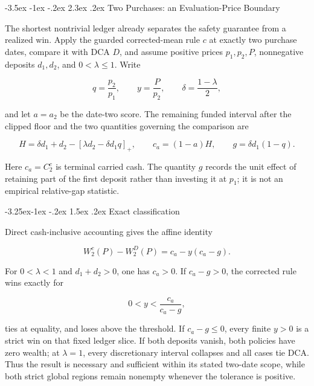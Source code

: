 \documentclass[12pt,a4paper,oneside]{report}
\makeatletter
\renewcommand\section{\@startsection{section}{1}{\z@}%
  {-3.5ex \@plus -1ex \@minus -.2ex}%
  {2.3ex \@plus .2ex}%
  {\normalfont\fontsize{14}{17}\selectfont\bfseries}}
\renewcommand\subsection{\@startsection{subsection}{2}{\z@}%
  {-3.25ex\@plus -1ex \@minus -.2ex}%
  {1.5ex \@plus .2ex}%
  {\normalfont\fontsize{12}{15}\selectfont\bfseries}}
\makeatother
\begin{document}
\section{Two Purchases: an Evaluation-Price Boundary}
\label{sec:two-purchase}

The shortest nontrivial ledger already separates the safety guarantee from a
realized win. Apply the guarded corrected-mean rule $c$ at exactly two purchase
dates, compare it with DCA $D$, and assume positive prices $p_1,p_2,P$,
nonnegative deposits $d_1,d_2$, and $0<\lambda\leq1$. Write

\begin{equation}
  q=\frac{p_2}{p_1},\qquad
  y=\frac{P}{p_2},\qquad
  \delta=\frac{1-\lambda}{2},
  \label{eq:two-purchase-ratios}
\end{equation}

and let $a=a_2$ be the date-two score. The remaining funded interval after
the clipped floor and the two quantities governing the comparison are

\begin{equation}
  H=\delta d_1+d_2-
    \left[\lambda d_2-\delta d_1q\right]_+,
  \qquad
  c_a=(1-a)H,
  \qquad
  g=\delta d_1(1-q).
  \label{eq:two-purchase-components}
\end{equation}

Here $c_a=C_2^c$ is terminal carried cash. The quantity $g$ records the unit
effect of retaining part of the first deposit rather than investing it at
$p_1$; it is not an empirical relative-gap statistic.

\subsection{Exact classification}
\label{thm:two-purchase}

Direct cash-inclusive accounting gives the affine identity

\begin{equation}
  \boxed{W_2^c(P)-W_2^D(P)=c_a-y(c_a-g).}
  \label{eq:two-purchase-boundary}
\end{equation}

For $0<\lambda<1$ and $d_1+d_2>0$, one has $c_a>0$. If $c_a-g>0$, the
corrected rule wins exactly for

\begin{equation}
  0<y<\frac{c_a}{c_a-g},
  \label{eq:two-purchase-win-region}
\end{equation}

ties at equality, and loses above the threshold. If $c_a-g\leq0$, every finite
$y>0$ is a strict win on that fixed ledger slice. If both deposits vanish,
both policies have zero wealth; at $\lambda=1$, every discretionary interval
collapses and all cases tie DCA. Thus the result is necessary and sufficient
within its stated two-date scope, while both strict global regions remain
nonempty whenever the tolerance is positive.
\end{document}
